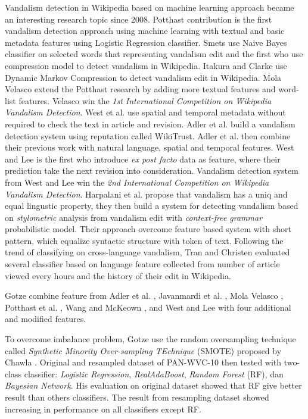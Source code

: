 Vandalism detection in Wikipedia based on machine learning approach
became an interesting research topic since 2008.
Potthast \cite{potthast2008automatic} contribution is the first vandalism
detection approach using machine learning with textual and basic
metadata features using Logistic Regression classifier.
Smets \cite{smets08automaticvandalism} use Naive Bayes classifier on selected
words that representing vandalism edit and the first who use compression model
to detect vandalism in Wikipedia.
Itakura and Clarke \cite{itakura2009using} use Dynamic Markov Compression to
detect vandalism edit in Wikipedia.
Mola Velasco \cite{mola2012wikipedia} extend the Potthast research by adding
more textual features and word-list features.
Velasco win the \textit{1st International Competition on Wikipedia Vandalism
Detection}.
West et al. \cite{west2011multilingual} use spatial and temporal metadata
without required to check the text in article and revision.
Adler et al. \cite{adler2011wikipedia} build a vandalism detection system using
reputation called WikiTrust.
Adler et al. \cite{adler2011wikipedia} then combine their previous work with
natural language, spatial and temporal features.
West and Lee \cite{west2011multilingual} is the first who introduce
\textit{ex post facto} data as feature, where their prediction take the next
revision into consideration.
Vandalism detection system from West and Lee win the \textit{2nd International
Competition on Wikipedia Vandalism Detection}.
Harpalani et al. \cite{harpalani2011language} propose that vandalism has
a uniq and equal lingustic property, they then build a system for detecting
vandalism based on \textit{stylometric} analysis from vandalism edit with
\textit{context-free grammar} probabilistic model.
Their approach overcome feature based system with short pattern, which equalize
syntactic structure with token of text.
Following the trend of classifying on cross-language vandalism, Tran and
Christen \cite{tran2013cross} evaluated several classifier based on
language feature collected from number of article viewed every hours and the
history of their edit in Wikipedia.

Gotze \cite{gotze2014advanced} combine feature from
Adler et al. \cite{adler2011wikipedia},
Javanmardi et al. \cite{javanmardi2011vandalism},
Mola Velasco \cite{mola2012wikipedia},
Potthast et al. \cite{potthast2008automatic},
Wang and McKeown \cite{wang2010got}, and
West and Lee \cite{west2011multilingual}
with four additional and modified features.

To overcome imbalance problem, Gotze use the random oversampling technique
called
\textit{Synthetic Minority Over-sampling TEchnique} (SMOTE)
proposed by Chawla
\cite{chawla2002smote}.
Original and resampled dataset of PAN-WVC-10 then tested with two-class
classifier:
\textit{Logistic Regression},
\textit{RealAdaBoost},
\textit{Random Forest} (RF), dan
\textit{Bayesian Network}.
His evaluation on original dataset showed that RF give better result than
others classifiers.
The result from resampling dataset showed increasing in performance on all
classifiers except RF.

